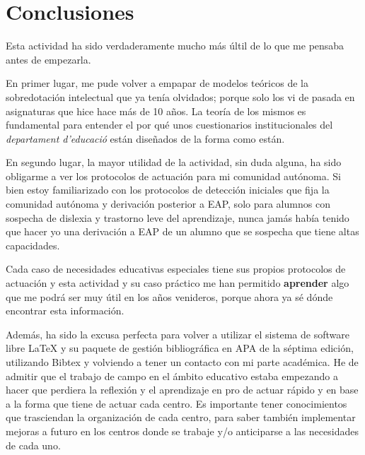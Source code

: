 \documentclass[12pt, a4paper]{article}
\begin{document}
	
	
	
	
	
	
	
	\newpage
	\section{Conclusiones}
	
	
	Esta actividad ha sido verdaderamente mucho más últil de lo que me pensaba antes de empezarla. 
	
	En primer lugar, me pude volver a empapar de modelos teóricos de la sobredotación intelectual que ya tenía olvidados; porque solo los vi de pasada en asignaturas que hice hace más de 10 años. La teoría de los mismos es fundamental para entender el por qué unos cuestionarios institucionales del \textit{departament d'educació} están diseñados de la forma como están.
	
	En segundo lugar, la mayor utilidad de la actividad, sin duda alguna, ha sido obligarme a ver los protocolos de actuación para mi comunidad autónoma. Si bien estoy familiarizado con los protocolos de detección iniciales que fija la comunidad autónoma y derivación posterior a EAP, solo para alumnos con sospecha de dislexia y trastorno leve del aprendizaje, nunca jamás había tenido que hacer yo una derivación a EAP de un alumno que se sospecha que tiene altas capacidades.
	
	Cada caso de necesidades educativas especiales tiene sus propios protocolos de actuación y esta actividad y su caso práctico me han permitido \textbf{aprender} algo que me podrá ser muy útil en los años venideros, porque ahora ya sé dónde encontrar esta información.
	
	Además, ha sido la excusa perfecta para volver a utilizar el sistema de software libre LaTeX y su paquete de gestión bibliográfica en APA de la séptima edición, utilizando Bibtex y volviendo a tener un contacto con mi parte académica. He de admitir que el trabajo de campo en el ámbito educativo estaba empezando a hacer que perdiera la reflexión y el aprendizaje en pro de actuar rápido y en base a la forma que tiene de actuar cada centro. Es importante tener conocimientos que trasciendan la organización de cada centro, para saber también implementar mejoras a futuro en los centros donde se trabaje y/o anticiparse a las necesidades de cada uno.
	

	
	
	
	
	
	\clearpage
	\printbibliography[title={Referencias Bibliográficas}]
	
\end{document}

